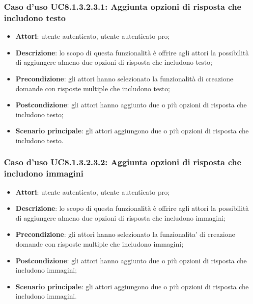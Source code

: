 \subsubsection{Caso d'uso UC8.1.3.2.3.1: Aggiunta opzioni di risposta che includono testo}
	\begin{itemize}
		\item
			\textbf{Attori}: utente autenticato, utente autenticato pro;
		\item		
			\textbf{Descrizione}: lo scopo di questa funzionalità è offrire agli attori la possibilità di aggiungere almeno due opzioni di risposta che includono testo;
		\item
			\textbf{Precondizione}: gli attori hanno selezionato la funzionalità di creazione domande con risposte multiple che includono testo; 
		\item
			\textbf{Postcondizione}: gli attori hanno aggiunto due o più opzioni di risposta che includono testo;
		\item
			\textbf{Scenario principale}: gli attori aggiungono due o più opzioni di risposta che includono testo. 			
	\end{itemize}	
	
\subsubsection{Caso d'uso UC8.1.3.2.3.2: Aggiunta opzioni di risposta che includono immagini}
	\begin{itemize}
		\item
			\textbf{Attori}: utente autenticato, utente autenticato pro;
		\item		
			\textbf{Descrizione}: lo scopo di questa funzionalità è offrire agli attori la possibilità di aggiungere almeno due opzioni di risposta che includono immagini;
		\item
			\textbf{Precondizione}: gli attori hanno selezionato la funzionalita' di creazione domande con risposte multiple che includono immagini; 
		\item
			\textbf{Postcondizione}: gli attori hanno aggiunto due o più opzioni di risposta che includono immagini;
		\item
			\textbf{Scenario principale}: gli attori aggiungono due o più opzioni di risposta che includono immagini. 			
	\end{itemize}
	

